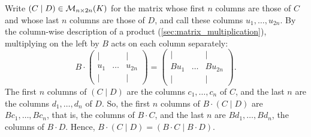 \begin{exercisesolution}
\label{sol:block_matrix_multiplication}
Write $(C \mid D) \in \mathcal{M}_{n \times 2n}(K)$ for the matrix whose first $n$ columns are those of $C$ and whose last $n$ columns are those of $D$, and call these columns $u_1, \dots, u_{2n}$. By the column-wise description of a product (\cref{sec:matrix_multiplication}), multiplying on the left by $B$ acts on each column separately:
\[
B \cdot \begin{pmatrix} | & & | \\ u_1 & \dots & u_{2n} \\ | & & | \end{pmatrix} = \begin{pmatrix} | & & | \\ B u_1 & \dots & B u_{2n} \\ | & & | \end{pmatrix}.
\]
The first $n$ columns of $(C \mid D)$ are the columns $c_1, \dots, c_n$ of $C$, and the last $n$ are the columns $d_1, \dots, d_n$ of $D$. So, the first $n$ columns of $B \cdot (C \mid D)$ are $Bc_1, \dots, Bc_n$, that is, the columns of $B \cdot C$, and the last $n$ are $Bd_1, \dots, Bd_n$, the columns of $B \cdot D$. Hence, $B \cdot (C \mid D) = (B \cdot C \mid B \cdot D)$.
\end{exercisesolution}



